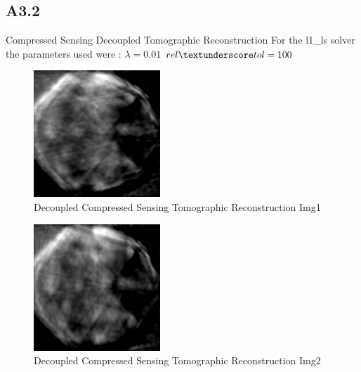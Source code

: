 \documentclass{article}
\begin{document}
\subsection*{A3.2}
Compressed Sensing Decoupled Tomographic Reconstruction
For the l1\_ls solver the parameters used were :
$\lambda = 0.01$
$rel \textunderscore tol = 100$
\begin{figure}[H]
  \centering
  \includegraphics[scale=0.5]{images/cs_decoupled_1}
  \caption{Decoupled Compressed Sensing Tomographic Reconstruction Img1}
  \label{fig:3}
\end{figure}
\begin{figure}[H]
  \centering
  \includegraphics[scale=0.5]{images/cs_decoupled_2}
  \caption{Decoupled Compressed Sensing Tomographic Reconstruction Img2}
  \label{fig:4}
\end{figure}
\end{document}
